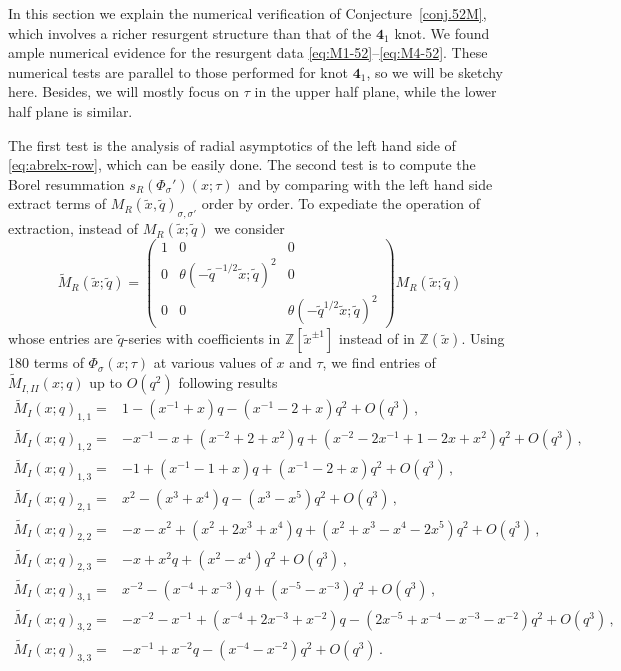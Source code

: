 \documentclass[12pt,reqno]{amsart}
\theoremstyle{definition}
\def\IZ{\mathbb{Z}}
\def\s{\sigma}
\def\tq{\tilde{q}}
\def\tx{\tilde{x}}
\def\th{\theta}
\def\wt{\widetilde}
\def\tx{\tilde{x}}
\def\md{\mathbf}
\def\IZ{\mathbb{Z}}
\newcommand{\knot}[1]{\md{#1}}
\newcommand{\nn}{\nonumber \\}
\begin{document}
In this section we explain the numerical verification of
Conjecture~\ref{conj.52M}, which involves a richer resurgent structure
than that of the $\knot{4}_1$ knot. 
We found ample numerical evidence for the resurgent data
\eqref{eq:M1-52}--\eqref{eq:M4-52}.  These numerical tests are
parallel to those performed for knot $\knot{4}_1$, so we will be
sketchy here. Besides, we will mostly focus on $\tau$ in the upper
half plane, while the lower half plane is similar.

The first test is the analysis of radial asymptotics of the left hand
side of \eqref{eq:abrelx-row}, which can be easily done.  The second
test is to compute the Borel resummation $s_R(\Phi_\s')(x;\tau)$ and
by comparing with the left hand side extract terms of
$M_R(\tx,\tq)_{\s,\s'}$ order by order.
To expediate the operation of extraction, instead of $M_R(\tx;\tq)$
we consider
\begin{equation}
  \wt{M}_R(\tx;\tq) =
  \begin{pmatrix}
    1&0&0\\
    0&\th(-\tq^{-1/2}\tx;\tq)^2&0\\
    0&0&\th(-\tq^{1/2}\tx;\tq)^2
  \end{pmatrix} M_R(\tx;\tq)
\end{equation}
whose entries are $\tq$-series
with coefficients in $\IZ[\tx^{\pm 1}]$ instead of in $\IZ(\tx)$.
Using 180 terms
of $\Phi_\s(x;\tau)$ at various values of $x$ and $\tau$, we find
entries of $\wt{M}_{I,II}(x;q)$ up to $O(q^2)$
following results
  \begin{align}
    \wt{M}_{I}(x;q)_{1,1}=
    &1-(x^{-1}+x)q-(x^{-1}-2+x)q^2+O(q^3)\,,\nn
      \wt{M}_{I}(x;q)_{1,2}=
    &-x^{-1}-x+(x^{-2}+2+x^2)q+(x^{-2}-2x^{-1}+1-2x+x^2)q^2+O(q^3)\,,\nn
      \wt{M}_{I}(x;q)_{1,3}=
    &-1+(x^{-1}-1+x)q+(x^{-1}-2+x)q^2+O(q^3)\,,\nn
      \wt{M}_{I}(x;q)_{2,1}=
    &x^2-(x^3+x^4)q-(x^3-x^5)q^2+O(q^3)\,,\nn
      \wt{M}_{I}(x;q)_{2,2}=
    &-x-x^2+(x^2+2x^3+x^4)q+(x^2+x^3-x^4-2x^5)q^2+O(q^3)\,,\nn
      \wt{M}_{I}(x;q)_{2,3}=
    &-x+x^2q+(x^2-x^4)q^2+O(q^3)\,,\nn
      \wt{M}_{I}(x;q)_{3,1}=
    &x^{-2}-(x^{-4}+x^{-3})q+(x^{-5}-x^{-3})q^2+O(q^3)\,,\nn
      \wt{M}_{I}(x;q)_{3,2}=
    &-x^{-2}-x^{-1}+(x^{-4}+2x^{-3}+x^{-2})q
      -(2x^{-5}+x^{-4}-x^{-3}-x^{-2})q^2+O(q^3)\,,\nn
      \wt{M}_{I}(x;q)_{3,3}=
    &-x^{-1}+x^{-2}q-(x^{-4}-x^{-2})q^2+O(q^3)\,.
  \end{align}
\end{document}
